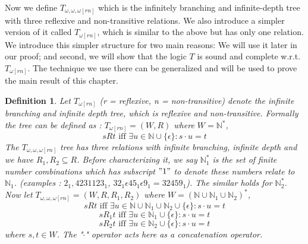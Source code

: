 \documentclass[12pt, a4paper]{scrartcl}
\newtheorem{definition}{Definition}[subsection]
\begin{document}
Now we define $T_{\omega,\omega,\omega[rn]}$ which is the infinitely branching and infinite-depth tree with three reflexive and non-transitive relations.
We also introduce a simpler version of it called $T_{\omega[rn]}$, which is similar to the above but has only one relation.
We introduce this simpler structure for two main reasons: We will use it later in our proof; and second, we will show that the logic $T$ is sound and complete w.r.t. $T_{\omega[rn]}$. The technique we use there
can be generalized and will be used to prove the main result of this chapter.


\begin{definition}
    Let $T_{\omega [rn]}$ (r = reflexive, n = non-transitive) denote the infinite branching and infinite depth tree, which is reflexive and non-transitive.
    Formally the tree can be defined as : $T_{\omega [rn]} = (W, R)$ where $W = \mathbb{N}^*$,  $$sRt \text{ iff } \exists u \in \mathbb{N} \cup \{\epsilon\} : s \cdot u = t$$
    The $T_{\omega,\omega,\omega [rn]}$ tree has three relations with infinite branching, infinite depth and we have $R_1,R_2 \subseteq R$. Before characterizing it, we say
    $\mathbb{N}_{1}^*$ is the set of finite number combinations which has subscript $"1"$ to denote these numbers relate to $\mathbb{N}_1$.  \newline 
    (examples : $2_{1}, 4231123_{1}$, $32_{1} \epsilon 45_{1} \epsilon 9_{1} = 32459_{1}$). The similar holds for $\mathbb{N}_2^*$.\newline \newline
    Now let $T_{\omega,\omega,\omega [rn]} = (W, R, R_1, R_2 )$ where $W = (\mathbb{N} \cup \mathbb{N}_{1} \cup \mathbb{N}_{2})^*$, 
    $$sRt \mbox{ iff } \exists u \in \mathbb{N} \cup \mathbb{N}_{1} \cup \mathbb{N}_{2} \cup \{\epsilon\} : s \cdot u = t$$
    $$sR_1t \mbox { iff } \exists u \in \mathbb{N}_{1} \cup \{\epsilon\} : s \cdot u = t$$
    $$sR_2t \mbox { iff } \exists u \in \mathbb{N}_{2} \cup \{\epsilon\} : s \cdot u = t$$
    where $s,t \in W$. The "$\cdot$" operator acts here as a concatenation operator.

    \begin{figure}[h]
\centering
{}
\end{figure}
\end{definition}
\end{document}
